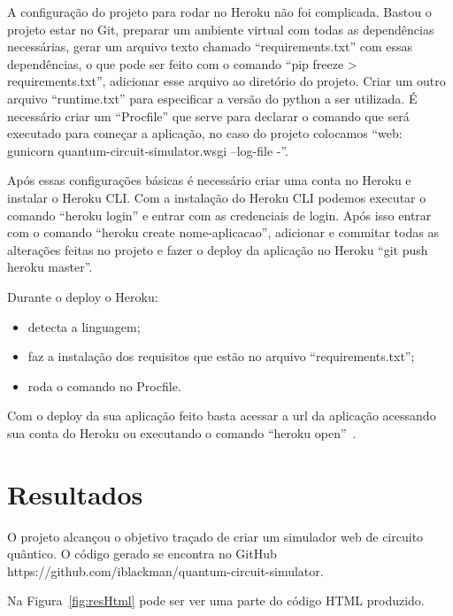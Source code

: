 \documentclass[a4paper, 12pt, oneside]{book}
\begin{document}
A configuração do projeto para rodar no Heroku não foi complicada. Bastou o projeto estar no Git, preparar um ambiente virtual com todas as dependências necessárias, gerar um arquivo texto chamado ``requirements.txt'' com essas dependências, o que pode ser feito com o comando ``pip freeze > requirements.txt'', adicionar esse arquivo ao diretório do projeto. Criar um outro arquivo ``runtime.txt'' para especificar a versão do python a ser utilizada. É necessário criar um ``Procfile'' que serve para declarar o comando que será executado para começar a aplicação, no caso do projeto colocamos ``web: gunicorn quantum-circuit-simulator.wsgi --log-file -''.

Após essas configurações básicas é necessário criar uma conta no Heroku e instalar o Heroku CLI. Com a instalação do Heroku CLI podemos executar o comando ``heroku login'' e entrar com as credenciais de login. Após isso entrar com o comando ``heroku create nome-aplicacao'', adicionar e commitar todas as alterações feitas no projeto e fazer o deploy da aplicação no Heroku ``git push heroku master''.

Durante o deploy o Heroku:
\begin{itemize}
\item detecta a linguagem;
\item faz a instalação dos requisitos que estão no arquivo ``requirements.txt'';
\item roda o comando no Procfile.
\end{itemize}

Com o deploy da sua aplicação feito basta acessar a url da aplicação acessando sua conta do Heroku ou executando o comando ``heroku open''~\cite{heroku-python}.

\chapter{Resultados}
\thispagestyle{empty} 

O projeto alcançou o objetivo traçado de criar um simulador web de circuito quântico. O código gerado se encontra no GitHub https://github.com/iblackman/quantum-circuit-simulator.

Na Figura~\ref{fig:resHtml} pode ser ver uma parte do código HTML produzido.
\end{document}
